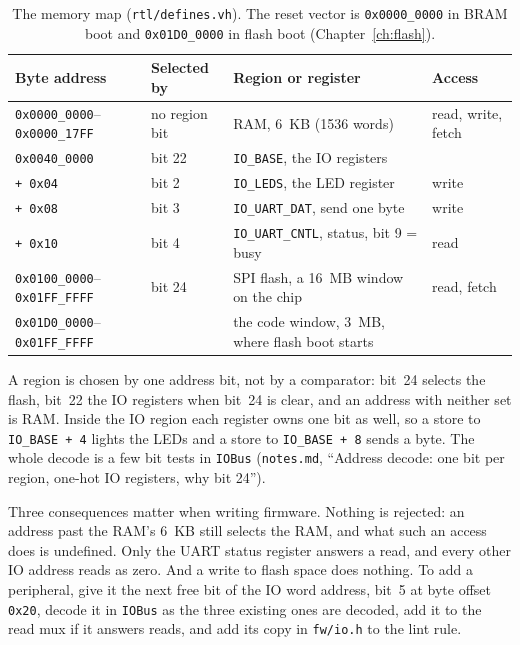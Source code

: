 \documentclass[11pt,a4paper]{report}
\newcommand{\notes}[1]{(\texttt{notes.md}, ``#1'')}
\begin{document}
\begin{table}[!ht]
  \centering
  \small
  \begin{tabular}{@{}llp{5.5cm}l@{}}
    \toprule
    Byte address & Selected by & Region or register & Access \\
    \midrule
    \texttt{0x0000\_0000}--\texttt{0x0000\_17FF} & no region bit & RAM, 6~KB (1536 words)
      & read, write, fetch \\
    \texttt{0x0040\_0000} & bit 22 & \texttt{IO\_BASE}, the IO registers & \\
    \quad\texttt{+ 0x04} & bit 2 & \texttt{IO\_LEDS}, the LED register & write \\
    \quad\texttt{+ 0x08} & bit 3 & \texttt{IO\_UART\_DAT}, send one byte & write \\
    \quad\texttt{+ 0x10} & bit 4 & \texttt{IO\_UART\_CNTL}, status, bit 9 = busy & read \\
    \texttt{0x0100\_0000}--\texttt{0x01FF\_FFFF} & bit 24 & SPI flash, a 16~MB window on
      the chip & read, fetch \\
    \quad\texttt{0x01D0\_0000}--\texttt{0x01FF\_FFFF} & & the code window, 3~MB, where
      flash boot starts & \\
    \bottomrule
  \end{tabular}
  \caption{The memory map (\texttt{rtl/defines.vh}). The reset vector is
    \texttt{0x0000\_0000} in BRAM boot and \texttt{0x01D0\_0000} in flash boot
    (Chapter~\ref{ch:flash}).}
  \label{tab:memory-map}
\end{table}

A region is chosen by one address bit, not by a comparator: bit~24 selects the flash, bit~22
the IO registers when bit~24 is clear, and an address with neither set is RAM. Inside the IO
region each register owns one bit as well, so a store to \texttt{IO\_BASE + 4} lights the
LEDs and a store to \texttt{IO\_BASE + 8} sends a byte. The whole decode is a few bit tests
in \texttt{IOBus} \notes{Address decode: one bit per region, one-hot IO registers, why bit
24}.

Three consequences matter when writing firmware. Nothing is rejected: an address past the
RAM's 6~KB still selects the RAM, and what such an access does is undefined. Only the UART
status register answers a read, and every other IO address reads as zero. And a write to flash
space does nothing. To add a peripheral, give it the next free bit of the IO word address,
bit~5 at byte offset \texttt{0x20}, decode it in \texttt{IOBus} as the three existing ones
are decoded, add it to the read mux if it answers reads, and add its copy in
\texttt{fw/io.h} to the lint rule.
\end{document}
